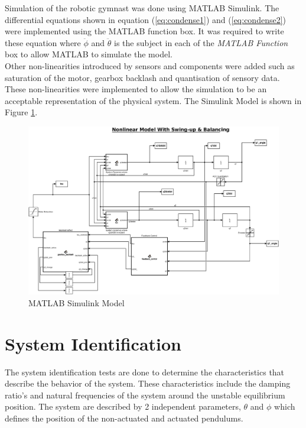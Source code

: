 Simulation of the robotic gymnast was done using MATLAB Simulink. The differential equations shown in equation (\ref{eq:condense1}) and (\ref{eq:condense2}) were implemented using the MATLAB function box. It was required to write these equation where $\ddot{\phi}$ and $\ddot{\theta}$ is the subject in each of the \textit{MATLAB Function} box to allow MATLAB to simulate the model.\\

Other non-linearities introduced by sensors and components were added such as saturation of the motor, gearbox backlash and quantisation of sensory data. These non-linearities were implemented to allow the simulation to be an acceptable representation of the physical system. The Simulink Model is shown in Figure \ref{fig:sim_nonlinearfeedback}.

\begin{figure}[h]
	\centering
	\includegraphics[scale=0.3]{./figs/simulink/simulink_model.eps}
	\caption{MATLAB Simulink Model}
	\label{fig:sim_nonlinearfeedback}
\end{figure}

\section{System Identification}

The system identification tests are done to determine the characteristics that describe the behavior of the system. These characteristics include the damping ratio's and natural frequencies of the system around the unstable equilibrium position. The system are described by 2 independent parameters, $\theta$ and $\phi$ which defines the position of the non-actuated and actuated pendulums.

